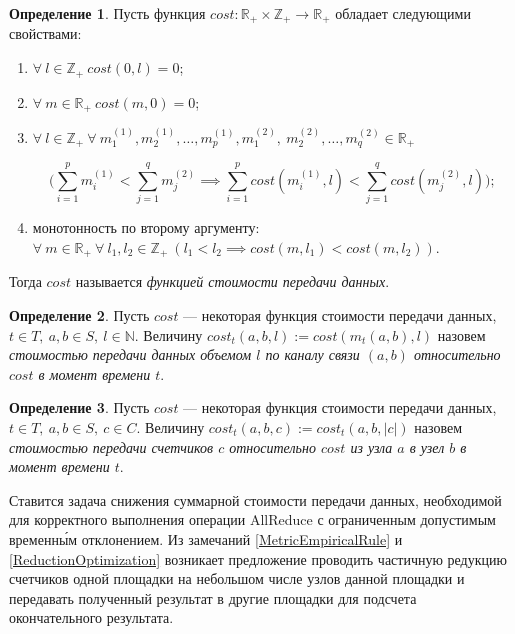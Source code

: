 \documentclass{article}
\theoremstyle{plain}
\theoremstyle{plain}
\theoremstyle{plain}
\theoremstyle{plain}
\theoremstyle{definition}
\newtheorem{definition}{Определение}[section]
\theoremstyle{remark}
\theoremstyle{plain}
\begin{document}
\begin{definition}
\label{CostFunctionDefinition}
    Пусть функция $cost \colon \mathbb{R}_{+} \times \mathbb{Z}_{+} \to \mathbb{R}_{+}$ обладает следующими свойствами:
    \begin{enumerate}
        \item $\forall\ l \in \mathbb{Z}_{+}\ cost(0, l) = 0$;
        
        \item $\forall\ m \in \mathbb{R}_{+}\ cost(m, 0) = 0$;
        
        \item $\forall\ l \in \mathbb{Z}_{+}\ \forall\ m_1^{(1)}, m_2^{(1)}, \ldots, m_p^{(1)}, m_1^{(2)},\ m_2^{(2)}, \ldots, m_q^{(2)} \in \mathbb{R}_{+}$ 
        
        \begin{equation*}
            \Big( \displaystyle \sum_{i = 1}^p m_i^{(1)} < \displaystyle \sum_{j = 1}^q m_j^{(2)} \implies \displaystyle \sum_{i = 1}^p cost(m_i^{(1)}, l) < \displaystyle \sum_{j = 1}^q cost(m_j^{(2)}, l) \Big);
        \end{equation*}
        
        \item монотонность по второму аргументу: $\forall\ m \in \mathbb{R}_{+}\ \forall\ l_1, l_2 \in \mathbb{Z}_{+}\ (l_1 < l_2 \implies cost(m, l_1) < cost(m, l_2))$.
    \end{enumerate}
    Тогда $cost$ называется \textit{функцией стоимости передачи данных}.
\end{definition}

\begin{definition}
    Пусть $cost$ --- некоторая функция стоимости передачи данных, $t \in T,\ a, b \in S,\ l \in \mathbb{N}$. Величину $cost_t(a, b, l) := cost(m_t(a, b), l)$ назовем \textit{стоимостью передачи данных объемом $l$ по каналу связи $(a, b)$ относительно $cost$ в момент времени $t$}.
\end{definition}

\begin{definition}
    Пусть $cost$ --- некоторая функция стоимости передачи данных, $t \in T,\ a, b \in S,\ c \in C$. Величину $cost_t(a, b, c) := cost_t(a, b, |c|)$ назовем \textit{стоимостью передачи счетчиков $c$ относительно $cost$ из узла $a$ в узел $b$ в момент времени $t$}.
\end{definition}

Ставится задача снижения суммарной стоимости передачи данных, необходимой для корректного выполнения операции AllReduce с ограниченным допустимым временн\'{ы}м отклонением. Из замечаний \ref{MetricEmpiricalRule} и \ref{ReductionOptimization} возникает предложение проводить частичную редукцию счетчиков одной площадки на небольшом числе узлов данной площадки и передавать полученный результат в другие площадки для подсчета окончательного результата.
\end{document}
